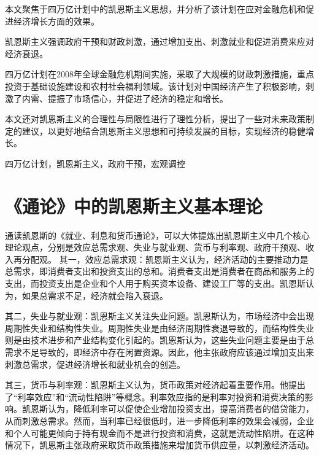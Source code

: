 \documentclass[UTF8,openany]{ctexbook}
\begin{document}
\linespread{1.5} \bigskip
\kaishu
本文聚焦于四万亿计划中的凯恩斯主义思想，并分析了该计划在应对金融危机和促进经济增长方面的效果。

凯恩斯主义强调政府干预和财政刺激，通过增加支出、刺激就业和促进消费来应对经济衰退。

四万亿计划在2008年全球金融危机期间实施，采取了大规模的财政刺激措施，重点投资于基础设施建设和农村社会福利领域。该计划对中国经济产生了积极影响，刺激了内需、提振了市场信心，并促进了经济的稳定和增长。

本文还对凯恩斯主义的合理性与局限性进行了理性分析，提出了一些对未来政策制定的建议，以更好地结合凯恩斯主义思想和可持续发展的目标，实现经济的稳健增长。

\bigskip

四万亿计划，凯恩斯主义，政府干预，宏观调控
\songti

\newpage
\tableofcontents
\thispagestyle{fancy}


\newpage
\chapter{《通论》中的凯恩斯主义基本理论}
\thispagestyle{fancy}
通读凯恩斯的《就业、利息和货币通论》，可以大体提炼出凯恩斯主义中几个核心理论观点，分别是效应总需求观、失业与就业观、货币与利率观、政府干预观、收入再分配观。
其一，效应总需求观：凯恩斯主义认为，经济活动的主要推动力是总需求，即消费者支出和投资支出的总和。消费者支出是消费者在商品和服务上的支出，而投资支出是企业和个人用于购买资本设备、建设工厂等的支出。凯恩斯认为，如果总需求不足，经济就会陷入衰退。

其二，失业与就业观：凯恩斯主义关注失业问题。凯恩斯认为，市场经济中会出现周期性失业和结构性失业。周期性失业是由经济周期性衰退导致的，而结构性失业则是由技术进步和产业结构变化引起的。凯恩斯认为，这些失业问题主要是由于总需求不足导致的，即经济中存在闲置资源。因此，他主张政府应该通过增加支出来刺激总需求，促进经济增长和就业机会的创造。

其三，货币与利率观：凯恩斯主义认为，货币政策对经济起着重要作用。他提出了“利率效应”和“流动性陷阱”等概念。利率效应指的是利率对投资和消费决策的影响。凯恩斯认为，降低利率可以促使企业增加投资支出，提高消费者的借贷能力，从而刺激总需求。然而，当利率已经很低时，进一步降低利率的效果会减弱，企业和个人可能更倾向于持有现金而不是进行投资和消费，这就是流动性陷阱。在这种情况下，凯恩斯主张政府采取货币政策措施来增加货币供应量，以刺激经济活动。
\end{document}
